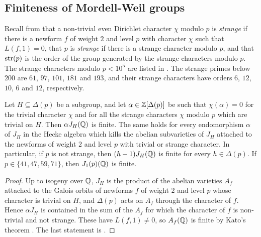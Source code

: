 \subsection{Finiteness of Mordell-Weil groups}
Recall from \cite[Definition 5.1]{DSt} that a non-trivial even Dirichlet character $\chi$ modulo $p$ is \textit{strange} if there is a newform $f$ of weight $2$ and level $p$ with character $\chi$ such that $L(f,1)=0$, that $p$ is \textit{strange} if there is a strange character modulo $p$, and that $\operatorname{str}(p)$ is the order of the group generated by the strange characters modulo $p$. The strange characters modulo $p<10^5$ are listed in \cite[Proposition 5.2 and Table 2]{DSt}. The strange primes below $200$ are $61$, $97$, $101$, $181$ and $193$, and their strange characters have orders $6$, $12$, $10$, $6$ and $12$, respectively.

\begin{lemma}\label{lem:finite}
Let $H\subseteq\Delta(p)$ be a subgroup, and let $\alpha\in\mathbb{Z}[\Delta(p)]$ be such that $\chi(\alpha)=0$ for the trivial character $\chi$ and for all the strange characters $\chi$ modulo $p$ which are trivial on $H$. Then $\alpha J_H(\mathbb{Q})$ is finite. The same holds for every endomorphism $\alpha$ of $J_H$ in the Hecke algebra which kills the abelian subvarieties of $J_H$ attached to the newforms of weight $2$ and level $p$ with trivial or strange character. In particular, if $p$ is not strange, then $(h-1)J_H(\mathbb{Q})$ is finite for every $h\in\Delta(p)$. If $p\in\{41,47,59,71\}$, then $J_1(p)(\mathbb{Q})$ is finite.
\end{lemma}

\begin{proof}
Up to isogeny over $\mathbb{Q}$, $J_H$ is the product of the abelian varieties $A_f$ attached to the Galois orbits of newforms $f$ of weight $2$ and level $p$ whose character is trivial on $H$, and $\Delta(p)$ acts on $A_f$ through the character of $f$. Hence $\alpha J_H$ is contained in the sum of the $A_f$ for which the character of $f$ is non-trivial and not strange. These have $L(f,1)\neq0$, so $A_f(\mathbb{Q})$ is finite by Kato's theorem \cite[Corollary 14.3]{kato}. The last statement is \cite[Proposition 3.1]{DKSS}.
\end{proof}

